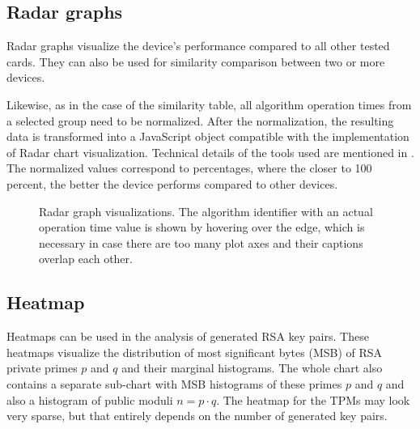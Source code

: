 \subsection{Radar graphs}
Radar graphs visualize the device's performance compared to all other tested cards. They can also be used for similarity comparison between two or more devices.

Likewise, as in the case of the similarity table, all algorithm operation times from a selected group need to be normalized. After the normalization, the resulting data is transformed into a JavaScript object compatible with the implementation of Radar chart visualization. Technical details of the tools used are mentioned in . The normalized values correspond to percentages, where the closer to 100 percent, the better the device performs compared to other devices. 

\begin{figure}[H]
  \centering
  \hfill
  \caption{Radar graph visualizations. The algorithm identifier with an actual operation time value is shown by hovering over the edge, which is necessary in case there are too many plot axes and their captions overlap each other.}
\end{figure}

\subsection{Heatmap}
Heatmaps can be used in the analysis of generated RSA key pairs. These heatmaps visualize the distribution of most significant bytes (MSB) of RSA private primes $p$ and $q$ and their marginal histograms. The whole chart also contains a separate sub-chart with MSB histograms of these primes $p$ and $q$ and also a histogram of public moduli $n = p \cdot q$. The heatmap for the TPMs may look very sparse, but that entirely depends on the number of generated key pairs.

